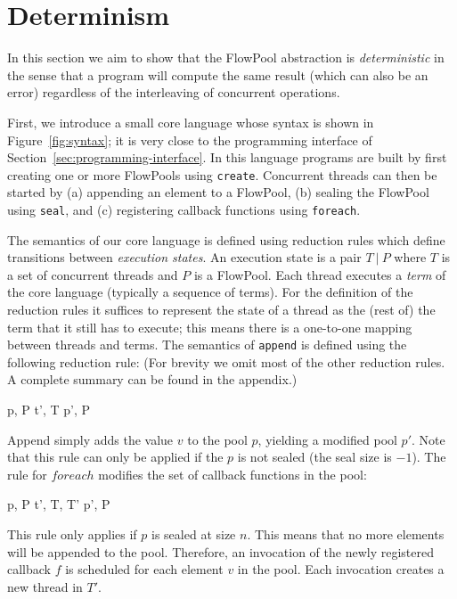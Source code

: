 \section{Determinism}

In this section we aim to show that the FlowPool abstraction is \emph{deterministic} in the sense that a program will compute the same result (which can also be an error) regardless of the interleaving of concurrent operations.

First, we introduce a small core language whose syntax is shown in Figure~\ref{fig:syntax}; it is very close to the programming interface of Section~\ref{sec:programming-interface}. In this language programs are built by first creating one or more FlowPools using \texttt{create}. Concurrent threads can then be started by (a) appending an element to a FlowPool, (b) sealing the FlowPool using \texttt{seal}, and (c) registering callback functions using \texttt{foreach}.

The semantics of our core language is defined using reduction rules which define transitions between \emph{execution states}. An execution state is a pair $T~|~P$ where $T$ is a set of concurrent threads and $P$ is a FlowPool. Each thread executes a \emph{term} of the core language (typically a sequence of terms). For the definition of the reduction rules it suffices to represent the state of a thread as the (rest of) the term that it still has to execute; this means there is a one-to-one mapping between threads and terms. The semantics of \verb|append| is defined using the following reduction rule: (For brevity we omit most of the other reduction rules. A complete summary can be found in the appendix.)

{  {p, P} {t', T} {p', P}
}

Append simply adds the value $v$ to the pool $p$, yielding a modified pool $p'$. Note that this rule can only be applied if the $p$ is not sealed (the seal size is $-1$). The rule for $foreach$ modifies the set of callback functions in the pool:

{  {p, P} {t', T, T'} {p', P}
}

This rule only applies if $p$ is sealed at size $n$. This means that no more elements will be appended to the pool. Therefore, an invocation of the newly registered callback $f$ is scheduled for each element $v$ in the pool. Each invocation creates a new thread in $T'$.

